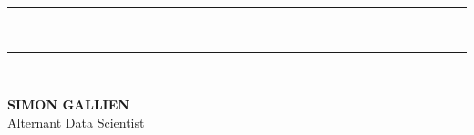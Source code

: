 \documentclass[a4paper,12pt]{article}
\begin{document}

\vspace*{1em}
\noindent
\hspace*{2.5em}
\begin{minipage}[t]{0.02\linewidth}
  \colorbox{bleufonce}{\color{bleufonce}\rule{2pt}{2em}}\\[-1pt]
  \colorbox{bleufonce}{\color{bleufonce}\rule{2pt}{2em}}\\[1pt]
\end{minipage}
\hspace{1em}
\begin{minipage}[t]{\dimexpr\linewidth-3em\relax}
  {\titlefont\Huge \textcolor{bleufonce}{\textbf{SIMON GALLIEN}}}\\[1em]
  {\titlefont\Large {Alternant Data Scientist}}

\end{minipage}

\vspace{-0.5em}

\end{document}
